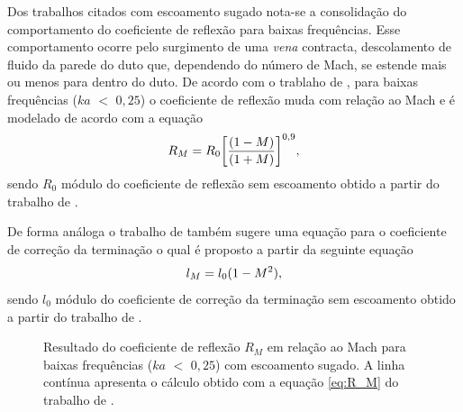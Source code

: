 Dos trabalhos citados com escoamento sugado nota-se a consolidação do comportamento do coeficiente de reflexão para baixas frequências. Esse comportamento ocorre pelo surgimento de uma \textit{vena} contracta, descolamento de fluido da parede do duto que, dependendo do número de Mach, se estende mais ou menos para dentro do duto. De acordo com o trablaho de , para baixas frequências ($ka$ $<$ $0,25$) o coeficiente de reflexão muda com relação ao Mach e é modelado de acordo com a equação
    \begin{equation}
        R_{M}\simbolo{$R_{M}$}{Coeficiente de reflexão em relação ao Mach} = R_{0}\bigg[\frac{(1 - M)}{(1 + M)}\bigg]^{0,9},
        \label{eq:R_M}
    \end{equation}
    sendo $R_{0}$ módulo do coeficiente de reflexão sem escoamento obtido a partir do trabalho de . 



    De forma análoga o trabalho de  também sugere uma equação para o coeficiente de correção da terminação o qual é proposto a partir da seguinte equação
    \begin{equation}
        l_{M}\simbolo{$l_{M}$}{Coeficiente de correção da terminação em relação ao Mach} = l_{0}(1 - M^{2}),
        \label{eq:l_M}
    \end{equation} 
    sendo $l_{0}$ módulo do coeficiente de correção da terminação sem escoamento obtido a partir do trabalho de .


\begin{figure}[h!]
\centering
  \caption[Coeficiente de reflexão $R_{M}$ com escoamento sugado]{Resultado do coeficiente de reflexão $R_{M}$ em relação ao Mach para baixas frequências ($ka$ $<$ $0,25$) com escoamento sugado. A linha contínua apresenta o cálculo obtido com a equação \ref{eq:R_M} do trabalho de .}
  \label{fig:comp3}
\end{figure}

